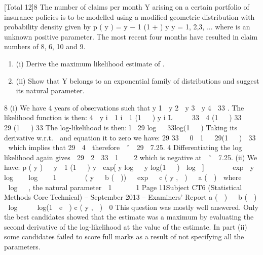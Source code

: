 \documentclass[a4paper,12pt]{article}
\begin{document}
[Total 12]8
The number of claims per month Y arising on a certain portfolio of insurance policies
is to be modelled using a modified geometric distribution with probability density
given by
p ( y \alpha ) =
\alpha y − 1
(1 + \alpha ) y
y = 1, 2,3, ...
where \alpha is an unknown positive parameter. The most recent four months have
resulted in claim numbers of 8, 6, 10 and 9.
\begin{enumerate}
\item (i) Derive the maximum likelihood estimate of \alpha .
\item (ii) Show that Y belongs to an exponential family of distributions and suggest its
natural parameter.
\end{enumerate}

\newpage


8
(i)
We have 4 years of observations such that y 1  y 2  y 3  y 4  33 . The
likelihood function is then:
4  y i  1
i  1 (1   ) y i
L  

 33  4
(1   ) 33

 29
(1   ) 33
The log-likelihood is then:
l  29 log   33log(1   )
Taking its derivative w.r.t.  and equation it to zero we have:
29
33

 0
 1  
29(1   )  33 
which implies that 29  4 
therefore  ˆ 
29
 7.25.
4
Differentiating the log likelihood again gives 
29

2

33
 1    2
which is
negative at  ˆ  7.25.
(ii)
We have:
p ( y ) 
 y  1
(1   ) y
 exp[ y log   y log(1   )  log  ]


  
 exp  y log 
  log  
 1   


 ( y   b (  ))

 exp 
 c ( y ,  ) 
 a (  )

where
  
  log 
 , the natural parameter
 1   
  1
Page 11Subject CT6 (Statistical Methods Core Technical) – September 2013 – Examiners’ Report
a (  )  
b (  )  log     log(1  e  )
c ( y ,  )  0
This question was mostly well answered. Only the best candidates showed that the estimate
was a maximum by evaluating the second derivative of the log-likelihood at the value of the
estimate. In part (ii) some candidates failed to score full marks as a result of not specifying
all the parameters.
\end{document}
